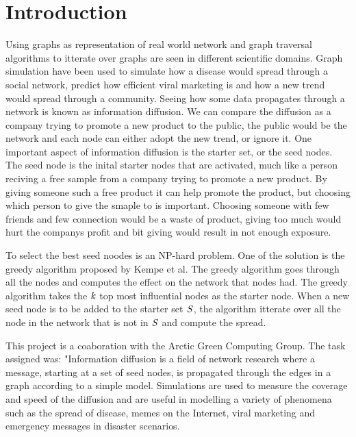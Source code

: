 \chapter{Introduction} 

Using graphs as representation of real world network and graph traversal algorithms to itterate over graphs are seen in different scientific domains\cite{HybridBFS2015}. Graph simulation have been used to simulate how a disease would spread through a social network\cite{DiseasOutbreak}, predict how efficient viral marketing is and how a new trend would spread through a community\cite{MaximizeSpread2003}. Seeing how some data propagates through a network is known as information diffusion. We can compare the diffusion as a company trying to promote a new product to the public, the public would be the network and each node can either adopt the new trend, or ignore it. One important aspect of information diffusion is the starter set, or the seed nodes. The seed node is the inital starter nodes that are activated, much like a person reciving a free sample from a company trying to promote a new product. By giving someone such a free product it can help promote the product, but choosing which person to give the smaple to is important. Choosing someone with few friends and few connection would be a waste of product, giving too much would hurt the companys profit and bit giving would result in not enough exposure.

To select the best seed noodes is an NP-hard problem\cite{MaximizeSpread2003}. One of the solution is the greedy algorithm\cite{MaximizeSpread2015} proposed by Kempe et al. The greedy algorithm goes through all the nodes and computes the effect on the network that nodes had. The greedy algorithm takes the $\it{k}$ top most influential nodes as the starter node. When a new seed node is to be added to the starter set $\it{S}$, the algorithm itterate over all the node in the network that is not in $\it{S}$ and compute the spread.

This project is a coaboration with the Arctic Green Computing Group. The task assigned was:
"Information diffusion is a field of network research where a message, starting at a set of seed nodes, is propagated through the edges in a graph according to a simple model. Simulations are used to measure the coverage and speed of the diffusion and are useful in modelling a variety of phenomena such as the spread of disease, memes on the Internet, viral marketing and emergency messages in disaster scenarios.

